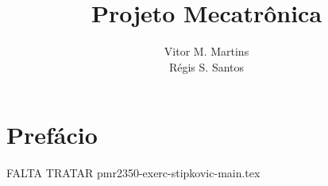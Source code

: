 \documentclass[a4paper,12pt]{memoir}
\title{Projeto Mecatr\^onica}
\author{Vitor M. Martins\\ R\'egis S. Santos}
\date{}
\begin{document}
\begin{titlingpage}
  \maketitle
\end{titlingpage}

\tableofcontents

\chapter{Prefácio}

\lipsum[1]





FALTA TRATAR pmr2350-exerc-stipkovic-main.tex
\end{document}
